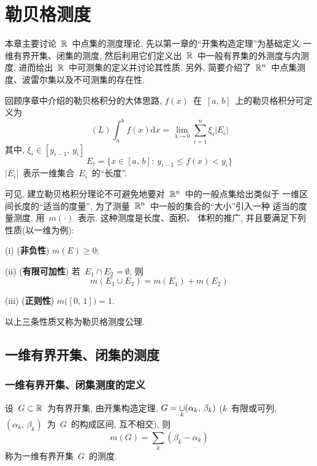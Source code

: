\chapter{勒贝格测度}

本章主要讨论~$\mathbb{R}$~中点集的测度理论, 先以第一章的``开集构造定理''为基础定义
一维有界开集、闭集的测度, 然后利用它们定义出~$\mathbb{R}$~中一般有界集的外测度与内测度,
进而给出~$\mathbb{R}$~中可测集的定义并讨论其性质. 另外, 简要介绍了~$\mathbb{R}^n$~中点集测度、波雷尔集以及不可测集的存在性.

回顾序章中介绍的勒贝格积分的大体思路, $f(x)$~在~$[a,\, b]$~上的勒贝格积分可定义为
\begin{equation} \label{eq20}
(L)\int_a ^b \!\! f(x) \mathrm{d}x = \lim_{\lambda \to 0} \sum^n _{i=1} \xi_i |E_i|
\end{equation}
其中, $\xi_i \in [y_{i-1},\,y_i]$
\[
E_i = \big\{ x \in [a,\,b]: \: y_{i-1} \leqslant f(x) < y_i \big\}
\]
$|E_i|$~表示一维集合~$E_i$~的``长度''.

可见, 建立勒贝格积分理论不可避免地要对~$\mathbb{R}^n$~中的一般点集给出类似于
一维区间长度的``适当的度量'', 为了测量~$\mathbb{R}^n$~中一般的集合的``大小''引入一种
适当的度量\raisebox{0.5mm}{-----}测度, 用~$m(\cdot)$~表示. 这种测度是长度、面积、
体积的推广, 并且要满足下列性质(以一维为例):

(i) (\textbf{非负性}) $m(E) \geqslant 0;$

(ii) (\textbf{有限可加性}) 若~$E_1 \cap E_2 = \emptyset$, 则
\[
m(E_1 \cup E_2) = m(E_1)+m(E_2)
\]

(iii) (\textbf{正则性}) $m\big([0,\,1]\big) = 1$.

以上三条性质又称为勒贝格测度公理.

\section{一维有界开集、闭集的测度}

\subsection{一维有界开集、闭集测度的定义}

\begin{definition}
设~$G \subset \mathbb{R}$~为有界开集, 由开集构造定理, $G = \mathop{\cup}\limits_k
(\alpha_k,\,\beta_k)$ ($k$~有限或可列, $(\alpha_k,\,\beta_k)$~为~$G$~的构成区间,
互不相交), 则
\[
m(G) = \sum_k (\beta_k - \alpha_k)
\]
称为一维有界开集~$G$~的测度.
\end{definition}

